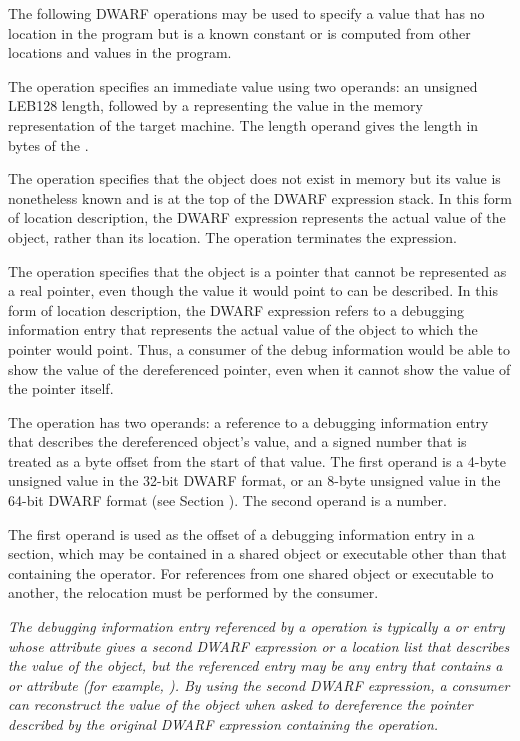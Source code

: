 The following DWARF operations may be used to specify a value
that has no location in the program but is a known constant
or is computed from other locations and values in the program.
\begin{enumerate}[1. ]
\itembfnl{\DWOPimplicitvalueTARG}
The \DWOPimplicitvalueTARG{} 
operation specifies an immediate value
using two operands: an unsigned LEB128 length, followed by
a  representing the value in the memory representation
of the target machine. The length operand gives the length
in bytes of the .

\itembfnl{\DWOPstackvalueTARG}
The \DWOPstackvalueTARG{} 
operation specifies that the object
does not exist in memory but its value is nonetheless known
and is at the top of the DWARF expression stack. In this form
of location description, the DWARF expression represents the
actual value of the object, rather than its location. The
\DWOPstackvalueINDX{} operation terminates the expression.

\itembfnl{\DWOPimplicitpointerTARG}
The \DWOPimplicitpointerNAME{} operation specifies that the object
is a pointer that cannot be represented as a real pointer,
even though the value it would point to can be described. In
this form of location description, the DWARF expression refers
to a debugging information entry that represents the actual
value of the object to which the pointer would point. Thus, a
consumer of the debug information would be able to show the
value of the dereferenced pointer, even when it cannot show
the value of the pointer itself.

The \DWOPimplicitpointerNAME{} operation has two operands: a 
reference to a debugging information entry that describes 
the dereferenced object's value, and a signed number that 
is treated as a byte offset from the start of that value. 
The first operand is a 4-byte unsigned value in the 32-bit 
DWARF format, or an 8-byte unsigned value in the 64-bit 
DWARF format (see Section 
).
The second operand is a  number.

The first operand is used as the offset of a debugging
information entry in a \dotdebuginfo{} section, which may be
contained in a shared object or executable other than that
containing the operator. For references from one shared object
or executable to another, the relocation must be performed by
the consumer.

\textit{The debugging information entry referenced by a 
\DWOPimplicitpointerNAME{} operation is typically a
\DWTAGvariable{} or \DWTAGformalparameter{} entry whose
\DWATlocation{} attribute gives a second DWARF expression or a
location list that describes the value of the object, but the
referenced entry may be any entry that contains a \DWATlocation{}
or \DWATconstvalue{} attribute (for example, \DWTAGdwarfprocedure).
By using the second DWARF expression, a consumer can
reconstruct the value of the object when asked to dereference
the pointer described by the original DWARF expression
containing the \DWOPimplicitpointer{} operation.}

\end{enumerate}

